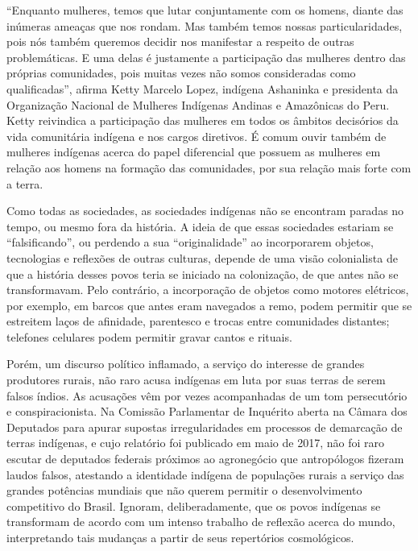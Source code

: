 ``Enquanto mulheres, temos que lutar conjuntamente com os homens, diante
das inúmeras ameaças que nos rondam. Mas também temos nossas
particularidades, pois nós também queremos decidir nos manifestar a
respeito de outras problemáticas. E uma delas é justamente a
participação das mulheres dentro das próprias comunidades, pois muitas
vezes não somos consideradas como qualificadas'', afirma Ketty Marcelo
Lopez, indígena Ashaninka e presidenta da Organização Nacional de
Mulheres Indígenas Andinas e Amazônicas do Peru. Ketty reivindica a
participação das mulheres em todos os âmbitos decisórios da vida
comunitária indígena e nos cargos diretivos. É comum ouvir também de
mulheres indígenas acerca do papel diferencial que possuem as mulheres
em relação aos homens na formação das comunidades, por sua relação mais
forte com a terra.

Como todas as sociedades, as sociedades indígenas não se encontram
paradas no tempo, ou mesmo fora da história. A ideia de que essas
sociedades estariam se ``falsificando'', ou perdendo a sua
``originalidade'' ao incorporarem objetos, tecnologias e reflexões de
outras culturas, depende de uma visão colonialista de que a história
desses povos teria se iniciado na colonização, de que antes não se
transformavam. Pelo contrário, a incorporação de objetos como motores
elétricos, por exemplo, em barcos que antes eram navegados a remo, podem
permitir que se estreitem laços de afinidade, parentesco e trocas entre
comunidades distantes; telefones celulares podem permitir gravar cantos
e rituais.

Porém, um discurso político inflamado, a serviço do interesse de grandes
produtores rurais, não raro acusa indígenas em luta por suas terras de
serem falsos índios. As acusações vêm por vezes acompanhadas de um tom
persecutório e conspiracionista. Na Comissão Parlamentar de Inquérito
aberta na Câmara dos Deputados para apurar supostas irregularidades em
processos de demarcação de terras indígenas, e cujo relatório foi
publicado em maio de 2017, não foi raro escutar de deputados federais
próximos ao agronegócio que antropólogos fizeram laudos falsos,
atestando a identidade indígena de populações rurais a serviço das
grandes potências mundiais que não querem permitir o desenvolvimento
competitivo do Brasil. Ignoram, deliberadamente, que os povos indígenas
se transformam de acordo com um intenso trabalho de reflexão acerca do
mundo, interpretando tais mudanças a partir de seus repertórios
cosmológicos.


